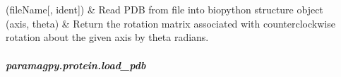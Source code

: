 \documentclass[a4paper,10pt,english,openany,oneside]{sphinxmanual}
\begin{document}
\begin{savenotes}\sphinxatlongtablestart\begin{longtable}{}
\hline

\endfirsthead

%
{}\\
\hline

\endhead

\hline
{}\\
\endfoot

\endlastfoot

{\hyperref[\detokenize{reference/generated/paramagpy.protein.load_pdb:paramagpy.protein.load_pdb}]{}}(fileName{[}, ident{]})
&
Read PDB from file into biopython structure object
\\
\hline
{\hyperref[\detokenize{reference/generated/paramagpy.protein.rotation_matrix:paramagpy.protein.rotation_matrix}]{}}(axis, theta)
&
Return the rotation matrix associated with counterclockwise rotation about the given axis by theta radians.
\\
\hline
\end{longtable}\sphinxatlongtableend\end{savenotes}


\subparagraph{paramagpy.protein.load\_pdb}
\label{\detokenize{reference/generated/paramagpy.protein.load_pdb:paramagpy-protein-load-pdb}}\label{\detokenize{reference/generated/paramagpy.protein.load_pdb::doc}}
\end{document}
